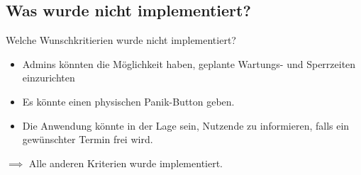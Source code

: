 \documentclass{sdqbeamer}
\begin{document}
    \subsection{Was wurde nicht implementiert?}
    \begin{frame}{Welche Wunschkritierien wurde nicht implementiert?}
    
        \begin{itemize}
           \item Admins könnten die Möglichkeit haben, geplante Wartungs- und Sperrzeiten einzurichten
           \item Es könnte einen physischen Panik-Button geben. 
           \item Die Anwendung könnte in der Lage sein, Nutzende zu informieren, falls ein gewünschter Termin frei wird.
        \end{itemize}
       
        
        \hfill \break
        \hfill \break
        $\implies$ Alle anderen Kriterien wurde implementiert.
    \end{frame}
    
    
\end{document}

